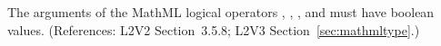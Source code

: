 The arguments of the MathML logical operators ,
, , and  must have boolean values.
(References: L2V2 Section~3.5.8; L2V3 Section~\ref{sec:mathmltype}.)
